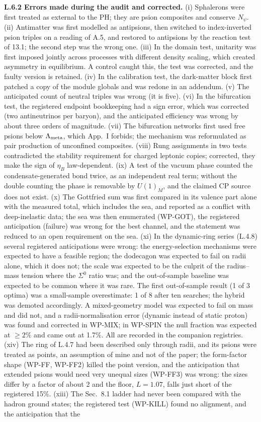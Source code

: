 \documentclass[11pt,letterpaper]{article}
\begin{document}
\noindent \textbf{L.6.2 Errors made during the audit and corrected. }(i) Sphalerons were first treated as external to the PH; they are psion composites and conserve $N_\psi$. (ii) Antimatter was first modelled as antipsions, then switched to index-inverted psion triples on a reading of A.5, and restored to antipsions by the reaction test of 13.1; the second step was the wrong one. (iii) In the domain test, unitarity was first imposed jointly across processes with different density scaling, which created asymmetry in equilibrium. A control caught this, the test was corrected, and the faulty version is retained. (iv) In the calibration test, the dark-matter block first patched a copy of the module globals and was redone in an addendum. (v) The anticipated count of neutral triples was wrong (it is five). (vi) In the bifurcation test, the registered endpoint bookkeeping had a sign error, which was corrected (two antineutrinos per baryon), and the anticipated efficiency was wrong by about three orders of magnitude. (vii) The bifurcation networks first used free psions below $\Lambda_{\rm meta}$, which App.~I forbids; the mechanism was reformulated as pair production of unconfined composites. (viii) Rung assignments in two tests contradicted the stability requirement for charged leptonic copies; corrected, they make the sign of $\eta_B$ law-dependent. (ix) A test of the vacuum phase counted the condensate-generated bond twice, as an independent real term; without the double counting the phase is removable by $U(1)_M$, and the claimed CP source does not exist. (x) The Gottfried sum was first compared in its valence part alone with the measured total, which includes the sea, and reported as a conflict with deep-inelastic data; the sea was then enumerated (WP-GOT), the registered anticipation (failure) was wrong for the best channel, and the statement was reduced to an open requirement on the sea. (xi) In the dynamic-ring series (L.4.8) several registered anticipations were wrong: the energy-selection mechanisms were expected to have a feasible region; the dodecagon was expected to fail on radii alone, which it does not; the scale was expected to be the culprit of the radius--mass tension where the $\Sigma^0$ ratio was; and the out-of-sample baseline was expected to be common where it was rare. The first out-of-sample result (1 of 3 optima) was a small-sample overestimate: 1 of 8 after ten searches; the hybrid was demoted accordingly. A mixed-geometry model was expected to fail on mass and did not, and a radii-normalisation error (dynamic instead of static proton) was found and corrected in WP-MIX; in WP-SPIN the null fraction was expected at $\ge2\%$ and came out at 1.7\%. All are recorded in the companion registries. (xiv) The ring of L.4.7 had been described only through radii, and its psions were treated as points, an assumption of mine and not of the paper; the form-factor shape (WP-FF, WP-FF2) killed the point version, and the anticipation that extended psions would need very unequal sizes (WP-FF3) was wrong: the sizes differ by a factor of about 2 and the floor, $L=1.07$, falls just short of the registered 15\%. (xiii) The Sec.~8.1 ladder had never been compared with the hadron ground states; the registered test (WP-KILL) found no alignment, and the anticipation that the 
\end{document}
